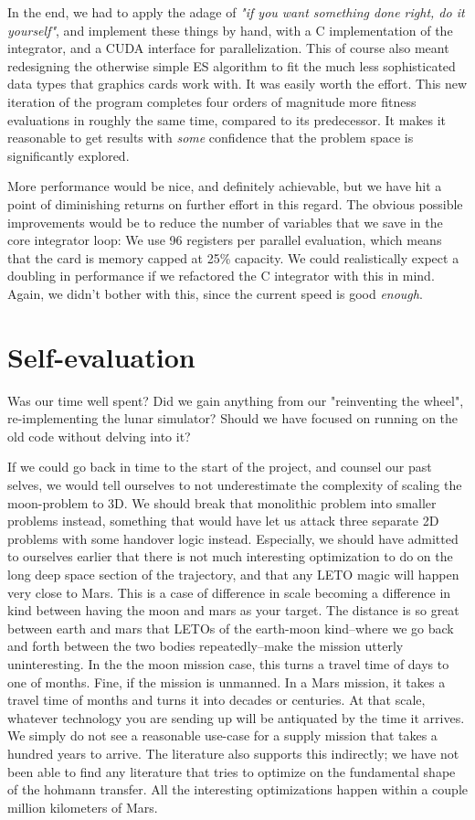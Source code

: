 In the end, we had to apply the adage of \textit{"if you want something done right, do it yourself"}, and implement these things by hand, with a C implementation of the integrator, and a CUDA interface for parallelization. This of course also meant redesigning the otherwise simple ES algorithm to fit the much less sophisticated data types that graphics cards work with. It was easily worth the effort. This new iteration of the program completes four orders of magnitude more fitness evaluations in roughly the same time, compared to its predecessor. It makes it reasonable to get results with \textit{some} confidence that the problem space is significantly explored. 

More performance would be nice, and definitely achievable, but we have hit a point of diminishing returns on further effort in this regard. The obvious possible improvements would be to reduce the number of variables that we save in the core integrator loop: We use 96 registers per parallel evaluation, which means that the card is memory capped at 25\% capacity. We could realistically expect a doubling in performance if we refactored the C integrator with this in mind. Again, we didn't bother with this, since the current speed is good \textit{enough}.

\section{Self-evaluation}
Was our time well spent? Did we gain anything from our "reinventing the wheel", re-implementing the lunar simulator? Should we have focused on running on the old code without delving into it?

If we could go back in time to the start of the project, and counsel our past selves, we would tell ourselves to not underestimate the complexity of scaling the moon-problem to 3D. We should break that monolithic problem into smaller problems instead, something that would have let us attack three separate 2D problems with some handover logic instead. Especially, we should have admitted to ourselves earlier that there is not much interesting optimization to do on the long deep space section of the trajectory, and that any LETO magic will happen very close to Mars. This is a case of difference in scale becoming a difference in kind between having the moon and mars as your target. The distance is so great between earth and mars that LETOs of the earth-moon kind--where we go back and forth between the two bodies repeatedly--make the mission utterly uninteresting. In the the moon mission case, this turns a travel time of days to one of months. Fine, if the mission is unmanned. In a Mars mission, it takes a travel time of months and turns it into decades or centuries. At that scale, whatever technology you are sending up will be antiquated by the time it arrives. We simply do not see a reasonable use-case for a supply mission that takes a hundred years to arrive. The literature also supports this indirectly; we have not been able to find any literature that tries to optimize on the fundamental shape of the hohmann transfer. All the interesting optimizations happen within a couple million kilometers of Mars.